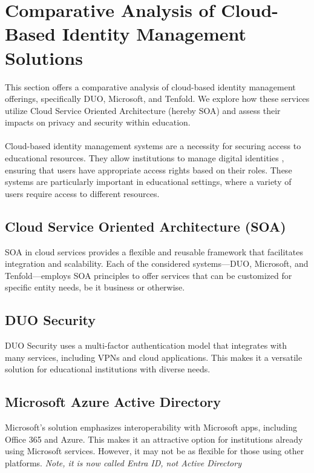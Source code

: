 \documentclass[10pt]{article}
\begin{document}
\section{Comparative Analysis of Cloud-Based Identity Management Solutions}
This section offers a comparative analysis of cloud-based identity management
offerings, specifically DUO, Microsoft, and Tenfold. We explore how these
services utilize Cloud Service Oriented Architecture (hereby SOA) and assess
their impacts on privacy and security within education.\\ \\
Cloud-based identity management systems are a necessity for securing access to
educational resources. They allow institutions to manage digital identities ,
ensuring that users have appropriate access rights based on their roles. These
systems are particularly important in educational settings, where a variety of
users require access to different resources.\cite{loginradius2023}

\subsection{Cloud Service Oriented Architecture (SOA)}
SOA in cloud services provides a flexible and reusable framework that
facilitates integration and scalability. Each of the considered systems—DUO,
Microsoft, and Tenfold—employs SOA principles to offer services that can be
customized for specific entity needs, be it business or otherwise.\cite{aws_soa}

\subsection{DUO Security}
DUO Security uses a multi-factor authentication model that integrates with many
services, including VPNs and cloud applications. This makes it a versatile
solution for educational institutions with diverse needs.\cite{duo_docs}

\subsection{Microsoft Azure Active Directory}
Microsoft's solution emphasizes interoperability with Microsoft apps, including
Office 365 and Azure. This makes it an attractive option for institutions
already using Microsoft services. However, it may not be as flexible for those
using other platforms. \textit{Note, it is now called Entra ID, not Active
	Directory}\cite{microsoft_entra}
\end{document}
